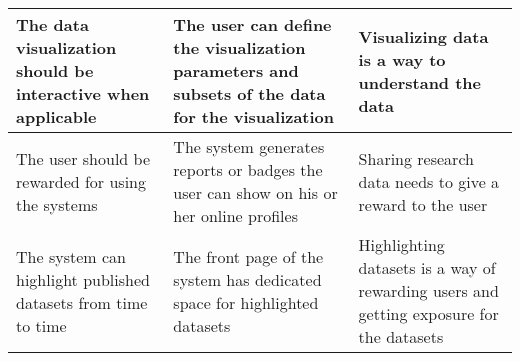 \begin{tabularx}{\textwidth}{| >{\raggedright}p{3cm} | >{\raggedright}p{3cm} | X |}
    \hline
    \rowcolor{Gray}
    The data visualization should be interactive when applicable  &The user can define the visualization parameters and subsets of the data for the visualization& Visualizing data is a way to understand the data\\
    \hline
    The user should be rewarded for using the systems &The system generates reports or badges the user can show on his or her online profiles& Sharing research data needs to give a reward to the user\\
    \hline
    \rowcolor{Gray}
    The system can highlight published datasets from time to time&The front page of the system has dedicated space for highlighted datasets&Highlighting datasets is a way of rewarding users and getting exposure for the datasets\\
    \hline
\end{tabularx}

\normalsize
